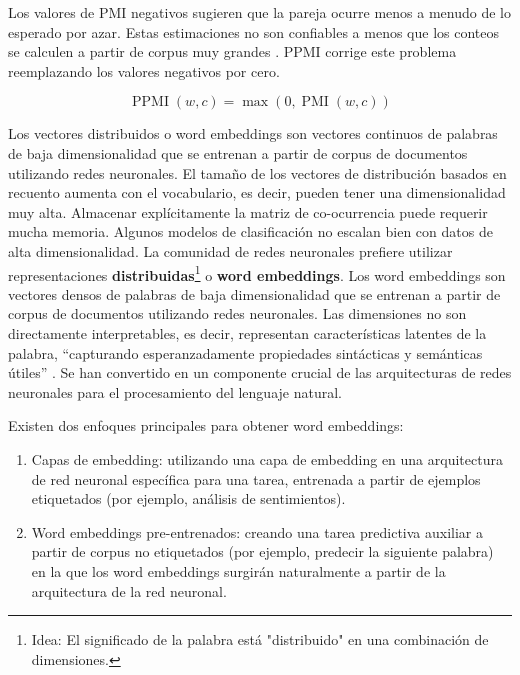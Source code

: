 Los valores de PMI negativos sugieren que la pareja ocurre menos a menudo de lo esperado por azar.
Estas estimaciones no son confiables a menos que los conteos se calculen a partir de corpus muy grandes \cite{JurafskyBook}.
PPMI corrige este problema reemplazando los valores negativos por cero.

\begin{equation}
 \operatorname{PPMI}(w, c)= \operatorname{max}(0,\operatorname{PMI}(w, c))
\end{equation}



Los vectores distribuidos o word embeddings son vectores continuos de palabras de baja dimensionalidad que se entrenan a partir de corpus de documentos utilizando redes neuronales.
El tamaño de los vectores de distribución basados en recuento aumenta con el vocabulario, es decir, pueden tener una dimensionalidad muy alta.
Almacenar explícitamente la matriz de co-ocurrencia puede requerir mucha memoria.
Algunos modelos de clasificación no escalan bien con datos de alta dimensionalidad.
La comunidad de redes neuronales prefiere utilizar representaciones \textbf{distribuidas}\footnote{Idea: El significado de la palabra está "distribuido" en una combinación de dimensiones.} o \textbf{word embeddings}.
Los word embeddings son vectores densos de palabras de baja dimensionalidad que se entrenan a partir de corpus de documentos utilizando redes neuronales.
Las dimensiones no son directamente interpretables, es decir, representan características latentes de la palabra, ``capturando esperanzadamente propiedades sintácticas y semánticas útiles'' \cite{turian2010word}.
Se han convertido en un componente crucial de las arquitecturas de redes neuronales para el procesamiento del lenguaje natural.


Existen dos enfoques principales para obtener word embeddings:

\begin{enumerate}
 \item Capas de embedding: utilizando una capa de embedding en una arquitectura de red neuronal específica para una tarea, entrenada a partir de ejemplos etiquetados (por ejemplo, análisis de sentimientos).
\item Word embeddings pre-entrenados: creando una tarea predictiva auxiliar a partir de corpus no etiquetados (por ejemplo, predecir la siguiente palabra) en la que los word embeddings surgirán naturalmente a partir de la arquitectura de la red neuronal.
\end{enumerate}




